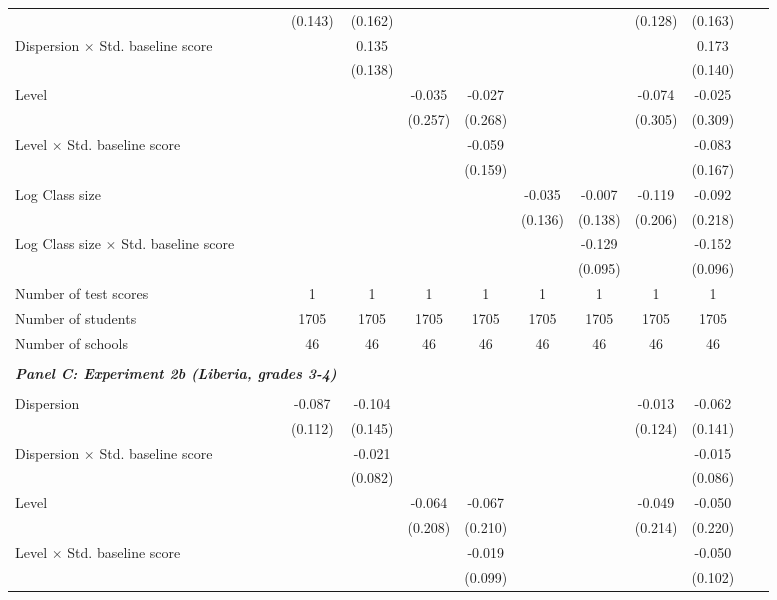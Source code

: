 \begin{center}
\begin{scriptsize}
\begin{threeparttable}
\begin{tabular} {@{} l l c c c c c c c c c c  @{}}
                 &  & (0.143) & (0.162) &  &  &  &  & (0.128) & (0.163) \\
Dispersion $\times$ Std. baseline score &  &  & 0.135 &  &  &  &  &  & 0.173 \\
                 &  &  & (0.138) &  &  &  &  &  & (0.140) \\
Level &  &  &  & -0.035 & -0.027 &  &  & -0.074 & -0.025 \\
                 &  &  &  & (0.257) & (0.268) &  &  & (0.305) & (0.309) \\
Level $\times$ Std. baseline score &  &  &  &  & -0.059 &  &  &  & -0.083 \\
                 &  &  &  &  & (0.159) &  &  &  & (0.167) \\
Log Class size &  &  &  &  &  & -0.035 & -0.007 & -0.119 & -0.092 \\
                 &  &  &  &  &  & (0.136) & (0.138) & (0.206) & (0.218) \\
Log Class size $\times$ Std. baseline score &  &  &  &  &  &  & -0.129 &  & -0.152 \\
                 &  &  &  &  &  &  & (0.095) &  & (0.096) \\
\midrule
Number of test scores &  & 1 & 1 & 1 & 1 & 1 & 1 & 1 & 1 \\
Number of students &  & 1705 & 1705 & 1705 & 1705 & 1705 & 1705 & 1705 & 1705 \\
Number of schools &  & 46 & 46 & 46 & 46 & 46 & 46 & 46 & 46 \\
 \midrule
\\
\multicolumn{3}{l}{\textbf{\textit{Panel C: Experiment 2b (Liberia, grades 3-4)}}} \\
\\
Dispersion &  & -0.087 & -0.104 &  &  &  &  & -0.013 & -0.062 \\
                 &  & (0.112) & (0.145) &  &  &  &  & (0.124) & (0.141) \\
Dispersion $\times$ Std. baseline score &  &  & -0.021 &  &  &  &  &  & -0.015 \\
                 &  &  & (0.082) &  &  &  &  &  & (0.086) \\
Level &  &  &  & -0.064 & -0.067 &  &  & -0.049 & -0.050 \\
                 &  &  &  & (0.208) & (0.210) &  &  & (0.214) & (0.220) \\
Level $\times$ Std. baseline score &  &  &  &  & -0.019 &  &  &  & -0.050 \\
                 &  &  &  &  & (0.099) &  &  &  & (0.102) \\

\end{tabular}
\end{threeparttable}
\end{scriptsize}
\end{center}
